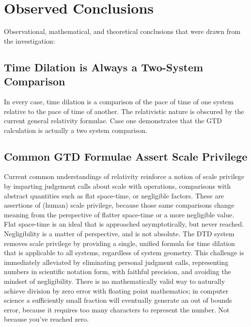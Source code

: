 \documentclass[twoside,twocolumn,9pt,fleqn]{article}
\begin{document}
\newpage

\newpage
\section{Observed Conclusions}
Observational, mathematical, and theoretical conclusions that were drawn from the investigation:

\subsection{Time Dilation is Always a Two-System Comparison}
In every case, time dilation is a comparison of the pace of time of one system relative to the pace of time of another. The relativistic nature is obscured by the current general relativity formulae. Case one demonstrates that the GTD calculation is actually a two system comparison.

\subsection{Common GTD Formulae Assert Scale Privilege}
Current common understandings of relativity reinforce a notion of scale privilege by imparting judgement calls about scale with operations, comparisons with abstract quantities such as flat space-time, or negligible factors. These are assertions of (human) scale privilege, because those same comparisons change meaning from the perspective of flatter space-time or a more negligible value. Flat space-time is an ideal that is approached asymptotically, but never reached. Negligibility is a matter of perspective, and is not absolute.
The DTD system removes scale privilege by providing a single, unified formula for time dilation that is applicable to all systems, regardless of system geometry. This challenge is immediately alleviated by eliminating personal judgment calls, representing numbers in scientific notation form, with faithful precision, and avoiding the mindset of negligibility. There is no mathematically valid way to naturally achieve division by zero error with floating point mathematics; in computer science a sufficiently small fraction will eventually generate an out of bounds error, because it requires too many characters to represent the number. Not because you've reached zero.
\end{document}

